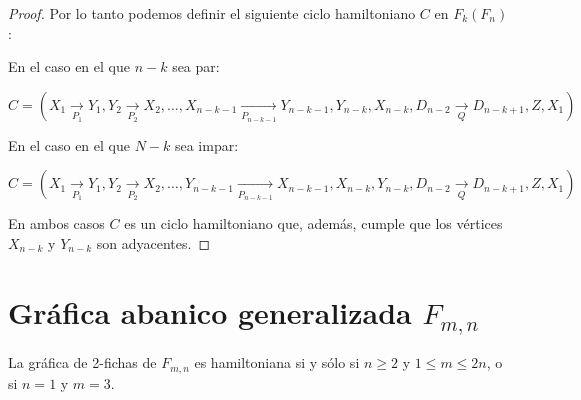 \begin{proof}
            Por lo tanto podemos definir el siguiente ciclo hamiltoniano $C$ en
            $F_k(F_n)$: 
    
            En el caso en el que $n-k$ sea par:
            
            $C =(X_1 \xrightarrow[P_1]{} Y_1, Y_2 \xrightarrow[P_2]{} X_2,
            \dots, X_{n-k-1} \xrightarrow[P_{n-k-1}]{} Y_{n-k-1}, Y_{n-k},
            X_{n-k}, D_{n-2} \xrightarrow[Q]{} D_{n-k+1}, Z, X_1)$
    
            En el caso en el que $N-k$ sea impar:
    
            $C = (X_1 \xrightarrow[P_1]{} Y_1, Y_2 \xrightarrow[P_2]{} X_2,
            \dots, Y_{n-k-1} \xrightarrow[P_{n-k-1}]{} X_{n-k-1}, X_{n-k},
            Y_{n-k}, D_{n-2} \xrightarrow[Q]{} D_{n-k+1}, Z, X_1)$
    
            En ambos casos $C$ es un ciclo hamiltoniano que, adem\'as, cumple
            que los v\'ertices $X_{n-k}$ y $Y_{n-k}$ son adyacentes. 
    
        \end{proof}

\section{Gr\'afica abanico generalizada $F_{m,n}$}%
\label{sec:GeneralFan}



\begin{teorema}
\label{teo:2-TokGenerFan}
    La gr\'afica de 2-fichas de $F_{m,n}$ es hamiltoniana si y s\'olo si $n \geq
    2$ y $1 \leq m \leq 2n$, o si $n=1$ y $m=3$.
\end{teorema}



